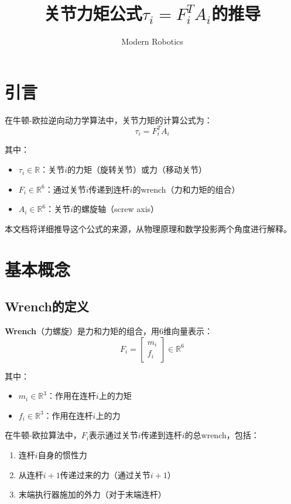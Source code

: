\documentclass[12pt,a4paper]{article}
\title{关节力矩公式$\tau_i = F_i^T A_i$的推导}
\author{Modern Robotics}
\date{}
\begin{document}
\maketitle

\section{引言}

在牛顿-欧拉逆向动力学算法中，关节力矩的计算公式为：
\begin{equation}
\tau_i = F_i^T A_i
\label{eq:main_formula}
\end{equation}

其中：
\begin{itemize}
\item $\tau_i \in \mathbb{R}$：关节$i$的力矩（旋转关节）或力（移动关节）
\item $F_i \in \mathbb{R}^6$：通过关节$i$传递到连杆$i$的wrench（力和力矩的组合）
\item $A_i \in \mathbb{R}^6$：关节$i$的螺旋轴（screw axis）
\end{itemize}

本文档将详细推导这个公式的来源，从物理原理和数学投影两个角度进行解释。

\section{基本概念}

\subsection{Wrench的定义}

\textbf{Wrench}（力螺旋）是力和力矩的组合，用6维向量表示：
\begin{equation}
F_i = \begin{bmatrix}
m_i \\
f_i
\end{bmatrix} \in \mathbb{R}^6
\end{equation}

其中：
\begin{itemize}
\item $m_i \in \mathbb{R}^3$：作用在连杆$i$上的力矩
\item $f_i \in \mathbb{R}^3$：作用在连杆$i$上的力
\end{itemize}

在牛顿-欧拉算法中，$F_i$表示通过关节$i$传递到连杆$i$的总wrench，包括：
\begin{enumerate}
\item 连杆$i$自身的惯性力
\item 从连杆$i+1$传递过来的力（通过关节$i+1$）
\item 末端执行器施加的外力（对于末端连杆）
\end{enumerate}
\end{document}

